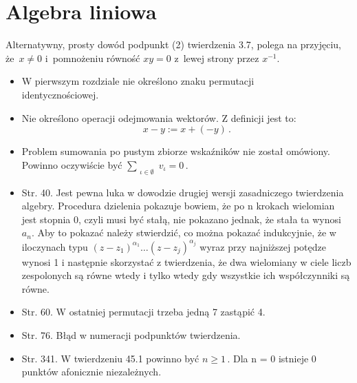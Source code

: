 \documentclass[a4paper,11pt]{article}
\begin{document}










\newpage
\section{Algebra liniowa}

\vspace{\spaceTwo}







\start {}

\vspace{\spaceFour}


\start {} Alternatywny, prosty dowód podpunkt (2) twierdzenia
3.7, polega na przyjęciu, że~$x \neq 0$ i~pomnożeniu równość $xy = 0$
z~lewej strony przez $x^{ -1 }$.

\vspace{\spaceFour}


\begin{itemize}
\item W pierwszym rozdziale nie określono znaku permutacji
  \\identycznościowej.
\item Nie określono operacji odejmowania wektorów. Z definicji jest
  to:$$x - y := x + ( -y ) \, .$$
\item Problem sumowania po pustym zbiorze wskaźników nie został
  omówiony. Powinno oczywiście być
  $\sum_{ \substack{ \iota \in \emptyset } } v_{ \iota } = 0 \, .$
\item Str. 40. Jest pewna luka w dowodzie drugiej wersji zasadniczego
  twierdzenia algebry. Procedura dzielenia pokazuje bowiem, że po n
  krokach wielomian jest stopnia 0, czyli musi być stałą, nie pokazano
  jednak, że stała ta wynosi $a_{ n }$. Aby to pokazać należy
  stwierdzić, co można pokazać indukcyjnie, że w iloczynach typu
  $( z - z_{ 1 } )^{ \alpha_{ 1 } } \ldots( z - z_{ j } )^{ \alpha_{ j } }$ wyraz
  przy najniższej potędze wynosi 1 i następnie skorzystać z
  twierdzenia, że dwa wielomiany w ciele liczb zespolonych są równe
  wtedy i tylko wtedy gdy wszystkie ich współczynniki są równe.
\item Str. 60. W ostatniej permutacji trzeba jedną 7 zastąpić 4.
\item Str. 76. Błąd w numeracji podpunktów twierdzenia.
\item Str. 341. W twierdzeniu 45.1 powinno być $n \geq 1 \, .$ Dla n = 0
  istnieje 0 punktów afonicznie niezależnych.
\end{itemize}
\end{document}
